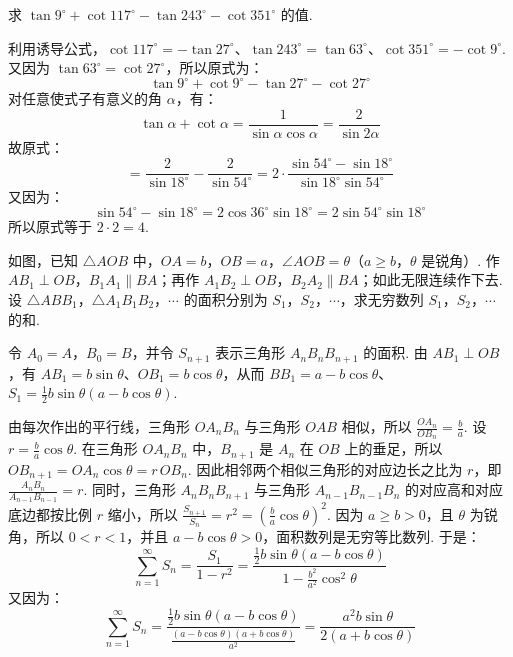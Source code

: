 \documentclass[UTF8,a4paper,oneside,11pt]{ctexbook}
\begin{document}
\begin{problem}

求 \(\tan 9^\circ+\cot 117^\circ-\tan 243^\circ-\cot 351^\circ\) 的值.
\end{problem}

\begin{solution}
利用诱导公式，\(\cot117^\circ=-\tan27^\circ\)、\(\tan243^\circ=\tan63^\circ\)、\(\cot351^\circ=-\cot9^\circ\).
又因为 \(\tan63^\circ=\cot27^\circ\)，所以原式为：
\[
 \tan9^\circ+\cot9^\circ-\tan27^\circ-\cot27^\circ
\]
对任意使式子有意义的角 \(\alpha\)，有：
\[
 \tan\alpha+\cot\alpha=\frac{1}{\sin\alpha\cos\alpha}=\frac{2}{\sin2\alpha}
\]
故原式：
\[
 =\frac{2}{\sin18^\circ}-\frac{2}{\sin54^\circ}
 =2\cdot\frac{\sin54^\circ-\sin18^\circ}{\sin18^\circ\sin54^\circ}
\]
又因为：
\[
 \sin54^\circ-\sin18^\circ=2\cos36^\circ\sin18^\circ=2\sin54^\circ\sin18^\circ
\]
所以原式等于 \(2\cdot2=4\).
\end{solution}

\begin{problem}

如图，已知 \(\triangle AOB\) 中，\(OA=b\)，\(OB=a\)，\(\angle AOB=\theta\)（\(a\geqslant b\)，\(\theta\) 是锐角）. 作 \(AB_1\perp OB\)，\(B_1A_1\parallel BA\)；再作 \(A_1B_2\perp OB\)，\(B_2A_2\parallel BA\)；如此无限连续作下去. 设 \(\triangle ABB_1\)，\(\triangle A_1B_1B_2\)，\(\cdots\) 的面积分别为 \(S_1\)，\(S_2\)，\(\cdots\)，求无穷数列 \(S_1\)，\(S_2\)，\(\cdots\) 的和.

\end{problem}

\begin{solution}
令 \(A_0=A\)，\(B_0=B\)，并令 \(S_{n+1}\) 表示三角形 \(A_nB_nB_{n+1}\) 的面积. 由 \(AB_1\perp OB\)，有 \(AB_1=b\sin\theta\)、\(OB_1=b\cos\theta\)，从而 \(BB_1=a-b\cos\theta\)、\(S_1=\frac12b\sin\theta\left(a-b\cos\theta\right)\).

由每次作出的平行线，三角形 \(OA_nB_n\) 与三角形 \(OAB\) 相似，所以 \(\frac{OA_n}{OB_n}=\frac{b}{a}\). 设 \(r=\frac{b}{a}\cos\theta\).
在三角形 \(OA_nB_n\) 中，\(B_{n+1}\) 是 \(A_n\) 在 \(OB\) 上的垂足，所以 \(OB_{n+1}=OA_n\cos\theta=r\,OB_n\).
因此相邻两个相似三角形的对应边长之比为 \(r\)，即 \(\frac{A_nB_n}{A_{n-1}B_{n-1}}=r\).
同时，三角形 \(A_nB_nB_{n+1}\) 与三角形 \(A_{n-1}B_{n-1}B_n\) 的对应高和对应底边都按比例 \(r\) 缩小，所以 \(\frac{S_{n+1}}{S_n}=r^2=\left(\frac{b}{a}\cos\theta\right)^2\).
因为 \(a\geqslant b>0\)，且 \(\theta\) 为锐角，所以 \(0<r<1\)，并且 \(a-b\cos\theta>0\)，面积数列是无穷等比数列. 于是：
\[
\sum_{n=1}^{\infty}S_n=\frac{S_1}{1-r^2}
=\frac{\frac12b\sin\theta\left(a-b\cos\theta\right)}{1-\frac{b^2}{a^2}\cos^2\theta}
\]
又因为：
\[
\sum_{n=1}^{\infty}S_n
=\frac{\frac12b\sin\theta\left(a-b\cos\theta\right)}{\frac{\left(a-b\cos\theta\right)\left(a+b\cos\theta\right)}{a^2}}
=\frac{a^2b\sin\theta}{2\left(a+b\cos\theta\right)}
\]
\end{solution}

\end{document}
